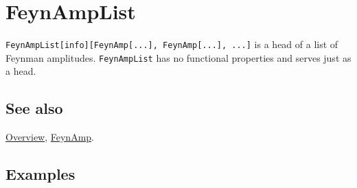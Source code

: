 \documentclass[../FeynCalcManual.tex]{subfiles}
\begin{document}
\hypertarget{feynamplist}{
\section{FeynAmpList}\label{feynamplist}}

\texttt{FeynAmpList[\allowbreak{}info][\allowbreak{}FeynAmp[\allowbreak{}...],\ \allowbreak{}FeynAmp[\allowbreak{}...],\ \allowbreak{}...]}
is a head of a list of Feynman amplitudes. \texttt{FeynAmpList} has no
functional properties and serves just as a head.

\subsection{See also}

\hyperlink{toc}{Overview}, \hyperlink{feynamp}{FeynAmp}.

\subsection{Examples}
\end{document}
